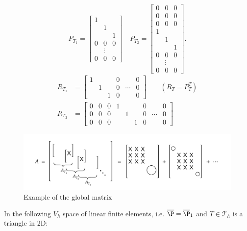 \begin{example}
\label{thm:examplefiniteelemtents}
\[
P_{T_{1}}= \begin{bmatrix}
	1& & \\
	 &1& \\
	 & &1\\
	0&0&0\\
	 &\vdots& \\
	0&0&0
\end{bmatrix}
\quad
P_{T_{2}}= \begin{bmatrix}
	0&0&0\\
	0&0&0\\
	0&0&0\\
	1& & \\
	 &1& \\
	 & &1\\
	0&0&0\\
	 &\vdots& \\
	0&0&0
\end{bmatrix}
.\] 
\begin{align*}
	R_{T_1}&=\begin{bmatrix}
	1 & & & 0 &  & 0 \\
	 & 1 & &0 & \cdots & 0 \\
	 &&1 & 0 &  & 0
\end{bmatrix}
\qquad
(R_{T}=P_{T}^{T}) \\
		R_{T_2}&=\begin{bmatrix}
	0 &0 &0 &1 & & & 0 &  & 0 \\
	 0 &0 &0 && 1 & &0 & \cdots & 0 \\
	 0 &0 &0 &&&1 & 0 &  & 0
\end{bmatrix}
\end{align*}
\begin{figure}[ht!]
	\begin{center}
		\includegraphics[width=\textwidth]{pics/chapter0/weird_matrix_equation.png}
	\end{center}
	\caption{Example of the global matrix}
	\label{fig:globalmatrixequation}
\end{figure}
\end{example}

In the following $V_{h}$ space of linear finite elements, i.e. $\overline{\P}= \overline{\P}_{1}$ and $T \in\mathcal{T}_{h}$ is a triangle in 2D:

